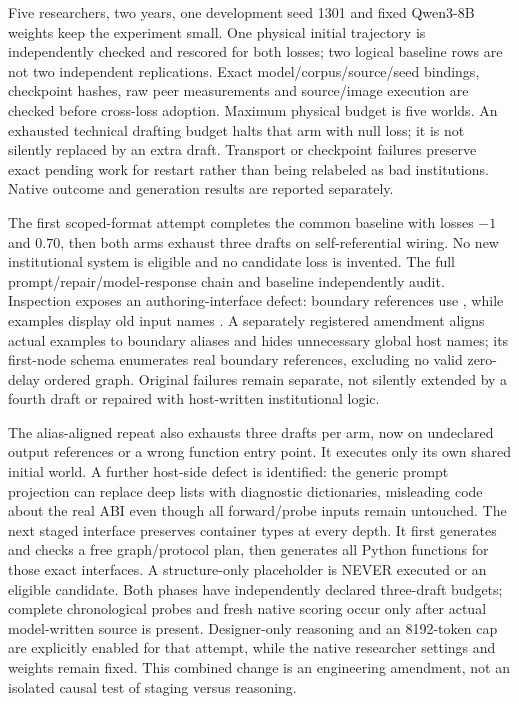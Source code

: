 Five researchers, two years, one development seed 1301 and fixed Qwen3-8B
weights keep the experiment small. One physical initial trajectory is
independently checked and rescored for both losses; two logical baseline rows
are not two independent replications. Exact model/corpus/source/seed bindings,
checkpoint hashes, raw peer measurements and source/image execution are
checked before cross-loss adoption. Maximum physical budget is five worlds.
An exhausted technical drafting budget halts that arm with null loss; it is
not silently replaced by an extra draft. Transport or checkpoint failures
preserve exact pending work for restart rather than being relabeled as bad
institutions. Native outcome and generation results are reported separately.

The first scoped-format attempt completes the common baseline with losses
$-1$ and $0.70$, then both arms exhaust three drafts on self-referential wiring.
No new institutional system is eligible and no candidate loss is invented.
The full prompt/repair/model-response chain and baseline independently audit.
Inspection exposes an authoring-interface defect: boundary references use
, while examples display old input names
. A separately registered amendment aligns actual
examples to boundary aliases and hides unnecessary global host names; its
first-node schema enumerates real boundary references, excluding no valid
zero-delay ordered graph. Original failures remain separate, not silently
extended by a fourth draft or repaired with host-written institutional logic.

The alias-aligned repeat also exhausts three drafts per arm, now on undeclared
output references or a wrong function entry point. It executes only its own
shared initial world. A further host-side defect is identified: the generic
prompt projection can replace deep lists with diagnostic dictionaries, misleading
code about the real ABI even though all forward/probe inputs remain untouched.
The next staged interface preserves container types at every depth. It first
generates and checks a free graph/protocol plan, then generates all Python
functions for those exact interfaces. A structure-only placeholder is NEVER
executed or an eligible candidate. Both phases have independently declared
three-draft budgets; complete chronological probes and fresh native scoring
occur only after actual model-written source is present. Designer-only reasoning
and an 8192-token cap are explicitly enabled for that attempt, while the native
researcher settings and weights remain fixed. This combined change is an
engineering amendment, not an isolated causal test of staging versus reasoning.

